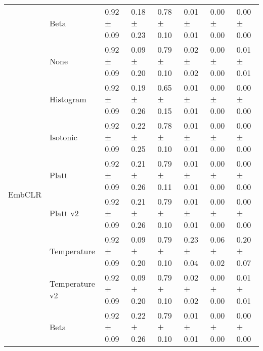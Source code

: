 \begin{tabular}{llllllll}
 & Beta & 0.92 ± 0.09 & 0.18 ± 0.23 & 0.78 ± 0.10 & 0.01 ± 0.01 & 0.00 ± 0.00 & 0.00 ± 0.00 \\
\cline{1-8}
\multirow[t]{8}{*}{EmbCLR} & None & 0.92 ± 0.09 & 0.09 ± 0.20 & 0.79 ± 0.10 & 0.02 ± 0.02 & 0.00 ± 0.00 & 0.01 ± 0.01 \\
 & Histogram & 0.92 ± 0.09 & 0.19 ± 0.26 & 0.65 ± 0.15 & 0.01 ± 0.01 & 0.00 ± 0.00 & 0.00 ± 0.00 \\
 & Isotonic & 0.92 ± 0.09 & 0.22 ± 0.25 & 0.78 ± 0.10 & 0.01 ± 0.01 & 0.00 ± 0.00 & 0.00 ± 0.00 \\
 & Platt & 0.92 ± 0.09 & 0.21 ± 0.26 & 0.79 ± 0.11 & 0.01 ± 0.01 & 0.00 ± 0.00 & 0.00 ± 0.00 \\
 & Platt v2 & 0.92 ± 0.09 & 0.21 ± 0.26 & 0.79 ± 0.10 & 0.01 ± 0.01 & 0.00 ± 0.00 & 0.00 ± 0.00 \\
 & Temperature & 0.92 ± 0.09 & 0.09 ± 0.20 & 0.79 ± 0.10 & 0.23 ± 0.04 & 0.06 ± 0.02 & 0.20 ± 0.07 \\
 & Temperature v2 & 0.92 ± 0.09 & 0.09 ± 0.20 & 0.79 ± 0.10 & 0.02 ± 0.02 & 0.00 ± 0.00 & 0.01 ± 0.01 \\
 & Beta & 0.92 ± 0.09 & 0.22 ± 0.26 & 0.79 ± 0.10 & 0.01 ± 0.01 & 0.00 ± 0.00 & 0.00 ± 0.00 \\
\cline{1-8}
\bottomrule
\end{tabular}
